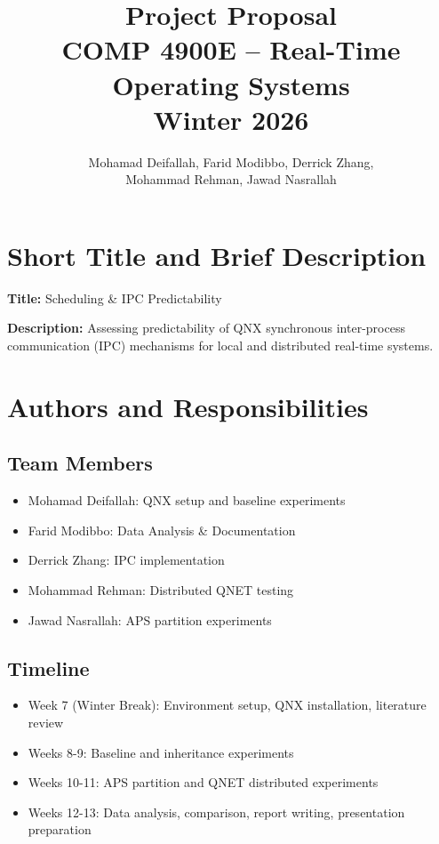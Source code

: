 \documentclass[11pt]{article}
\title{
    \vspace{-2em}
    \textbf{\Large Project Proposal}\\[0.5em]
    \large COMP 4900E -- Real-Time Operating Systems\\
    \normalsize Winter 2026
    \vspace{-1em}
}
\author{
Mohamad Deifallah, Farid Modibbo, Derrick Zhang,\\
Mohammad Rehman, Jawad Nasrallah
}
\date{}
\begin{document}
\maketitle

\section{Short Title and Brief Description}

\textbf{Title:} Scheduling \& IPC Predictability

\textbf{Description:} Assessing predictability of QNX synchronous inter-process communication (IPC) mechanisms for local and distributed real-time systems.

\section{Authors and Responsibilities}

\subsection{Team Members}

\begin{itemize}
\item Mohamad Deifallah: QNX setup and baseline experiments
\item Farid Modibbo: Data Analysis \& Documentation
\item Derrick Zhang: IPC implementation
\item Mohammad Rehman: Distributed QNET testing
\item Jawad Nasrallah: APS partition experiments
\end{itemize}

\subsection{Timeline}

\begin{itemize}
\item Week 7 (Winter Break): Environment setup, QNX installation, literature review
\item Weeks 8-9: Baseline and inheritance experiments
\item Weeks 10-11: APS partition and QNET distributed experiments
\item Weeks 12-13: Data analysis, comparison, report writing, presentation preparation
\end{itemize}
\end{document}

